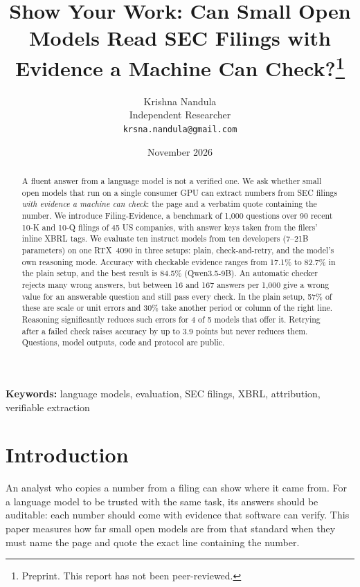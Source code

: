 \documentclass[11pt]{article}
\title{Show Your Work: Can Small Open Models Read SEC Filings with Evidence a Machine Can Check?\thanks{Preprint. This report has not been peer-reviewed.}}
\author{Krishna Nandula\\Independent Researcher\\\texttt{krsna.nandula@gmail.com}}
\date{November 2026}
\begin{document}
\maketitle

\begin{abstract}
A fluent answer from a language model is not a verified one. We ask whether small open models that run on a single consumer GPU can extract numbers from SEC filings \emph{with evidence a machine can check}: the page and a verbatim quote containing the number. We introduce Filing-Evidence, a benchmark of 1,000 questions over 90 recent 10-K and 10-Q filings of 45 US companies, with answer keys taken from the filers' inline XBRL tags. We evaluate ten instruct models from ten developers (7--21B parameters) on one RTX~4090 in three setups: plain, check-and-retry, and the model's own reasoning mode. Accuracy with checkable evidence ranges from 17.1\% to 82.7\% in the plain setup, and the best result is 84.5\% (Qwen3.5-9B). An automatic checker rejects many wrong answers, but between 16 and 167 answers per 1,000 give a wrong value for an answerable question and still pass every check. In the plain setup, 57\% of these are scale or unit errors and 30\% take another period or column of the right line. Reasoning significantly reduces such errors for 4 of 5 models that offer it. Retrying after a failed check raises accuracy by up to 3.9 points but never reduces them. Questions, model outputs, code and protocol are public.
\end{abstract}

\noindent\textbf{Keywords:} language models, evaluation, SEC filings, XBRL, attribution, verifiable extraction

\section{Introduction}
An analyst who copies a number from a filing can show where it came from. For a language model to be trusted with the same task, its answers should be auditable: each number should come with evidence that software can verify. This paper measures how far small open models are from that standard when they must name the page and quote the exact line containing the number.
\end{document}
